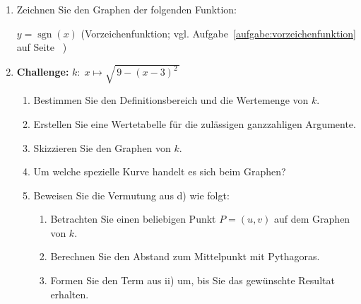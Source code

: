 \begin{enumerate}
          \vspace{1em}
          \begin{multicols}{4}
              \begin{enumerate}[label=(\roman*)]
                  \item \( y = 0.7x - 2 \)
                  \item \( y = -1.2x + 3 \)
                  \item \( y = x \)
                  \item \( y = \dfrac{2}{x+1} \)
                  \item \( y = 0.5x^{2} - 1.5x \)
                  \item \( y = 1.5^{x} \)
                  \item \( y = \sqrt{x-1} \)
              \end{enumerate}
          \end{multicols}
    \item Zeichnen Sie den Graphen der folgenden Funktion:

          \( y = \operatorname{sgn}(x) \) (Vorzeichenfunktion; vgl. Aufgabe~\ref{aufgabe:vorzeichenfunktion} auf Seite ~\pageref{aufgabe:vorzeichenfunktion})

    \item \textbf{Challenge:} \( k:\; x \mapsto \sqrt{\,9 - (x-3)^2\,} \)
          \begin{enumerate}
              \item Bestimmen Sie den Definitionsbereich und die Wertemenge von \(k\).
              \item Erstellen Sie eine Wertetabelle für die zulässigen ganzzahligen Argumente.
              \item Skizzieren Sie den Graphen von \(k\).
              \item Um welche spezielle Kurve handelt es sich beim Graphen?
              \item Beweisen Sie die Vermutung aus d) wie folgt:
                    \begin{enumerate}
                        \item[i)] Betrachten Sie einen beliebigen Punkt \(P=(u, v)\) auf dem Graphen von \(k\).
                        \item[ii)] Berechnen Sie den Abstand zum Mittelpunkt mit Pythagoras.
                        \item[iii)] Formen Sie den Term aus ii) um, bis Sie das gewünschte Resultat erhalten.
                    \end{enumerate}
          \end{enumerate}
\end{enumerate}
\newpage
